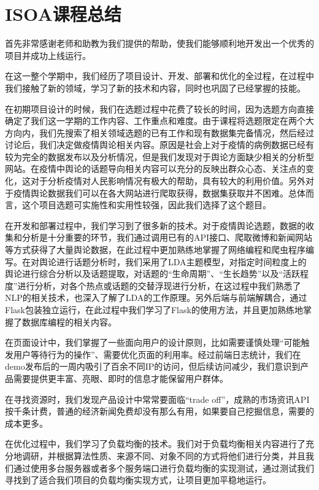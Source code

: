\documentclass{article}
\begin{document}
\section{ISOA课程总结}

首先非常感谢老师和助教为我们提供的帮助，使我们能够顺利地开发出一个优秀的项目并成功上线运行。

在这一整个学期中，我们经历了项目设计、开发、部署和优化的全过程，在过程中我们接触了新的领域，学习了新的技术和内容，同时也巩固了已经掌握的技能。


在初期项目设计的时候，我们在选题过程中花费了较长的时间，因为选题方向直接确定了我们这一学期的工作内容、工作重点和难度。由于课程将选题限定在两个大方向内，我们先搜索了相关领域选题的已有工作和现有数据集完备情况，然后经过讨论后，我们决定做疫情舆论相关内容。原因是社会上对于疫情的病例数据已经有较为完全的数据发布以及分析情况，但是我们发现对于舆论方面缺少相关的分析型网站。在疫情中舆论的话题导向相关内容可以充分的反映出群众心态、关注点的变化，这对于分析疫情对人民影响情况有极大的帮助，具有较大的利用价值。另外对于疫情舆论数据我们可以在各大网站进行爬取获得，数据集获取并不困难。总体而言，这个项目选题可实施性和实用性较强，因此我们选择了这个题目。


在开发和部署过程中，我们学习到了很多新的技术。对于疫情舆论选题，数据的收集和分析是十分重要的环节，我们通过调用已有的API接口、爬取微博和新闻网站等方式获得了大量舆论数据，在此过程中更加熟练地掌握了网络编程和爬虫程序编写。在对舆论进行话题分析时，我们采用了LDA主题模型，对指定时间粒度上的舆论进行综合分析以及话题提取，对话题的“生命周期”、“生长趋势”以及“活跃程度”进行分析，对各个热点或话题的交替浮现进行分析，在这过程中我们熟悉了NLP的相关技术，也深入了解了LDA的工作原理。另外后端与前端解耦合，通过Flask包装独立运行，在此过程中我们学习了Flask的使用方法，并且更加熟练地掌握了数据库编程的相关内容。

在页面设计中，我们掌握了一些面向用户的设计原则，比如需要谨慎处理“可能触发用户等待行为的操作”、需要优化页面的利用率。经过前端日志统计，我们在demo发布后的一周内吸引了百余不同IP的访问，但后续访问减少，我们意识到产品需要提供更丰富、亮眼、即时的信息才能保留用户群体。

在寻找资源时，我们发现产品设计中常常要面临“trade off”，成熟的市场资讯API按千条计费，普通的经济新闻免费却没有那么有用，如果要自己挖掘信息，需要的成本更多。

在优化过程中，我们学习了负载均衡的技术。我们对于负载均衡相关内容进行了充分地调研，并根据算法性质、来源不同、对象不同的方式将他们进行分类，并且我们通过使用多台服务器或者多个服务端口进行负载均衡的实现测试，通过测试我们寻找到了适合我们项目的负载均衡实现方式，让项目更加平稳地运行。
\end{document}
